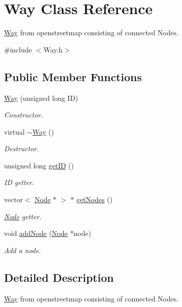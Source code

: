 \hypertarget{classWay}{\section{Way Class Reference}
\label{classWay}
}


\hyperlink{classWay}{Way} from openstreetmap consisting of connected Nodes.  




{\ttfamily \#include $<$Way.\-h$>$}

\subsection*{Public Member Functions}
\begin{DoxyCompactItemize}
\item 
\hyperlink{classWay_ab4715d81653126b9c799aff81facf800}{Way} (unsigned long I\-D)
\begin{DoxyCompactList}\small\item\em Constructor. \end{DoxyCompactList}\item 
virtual \hyperlink{classWay_aa118212423fa0f1b5c33663e1e0d0b74}{$\sim$\-Way} ()
\begin{DoxyCompactList}\small\item\em Destructor. \end{DoxyCompactList}\item 
unsigned long \hyperlink{classWay_a860214f9a48695b794298c29c829fc40}{get\-I\-D} ()
\begin{DoxyCompactList}\small\item\em I\-D getter. \end{DoxyCompactList}\item 
vector$<$ \hyperlink{classNode}{Node} $\ast$ $>$ $\ast$ \hyperlink{classWay_a690c2eeae8128b5f8d201bba41570d71}{get\-Nodes} ()
\begin{DoxyCompactList}\small\item\em \hyperlink{classNode}{Node} getter. \end{DoxyCompactList}\item 
void \hyperlink{classWay_ada3668577e62311e7c56d2575e5edd00}{add\-Node} (\hyperlink{classNode}{Node} $\ast$node)
\begin{DoxyCompactList}\small\item\em Add a node. \end{DoxyCompactList}\end{DoxyCompactItemize}


\subsection{Detailed Description}
\hyperlink{classWay}{Way} from openstreetmap consisting of connected Nodes. 

